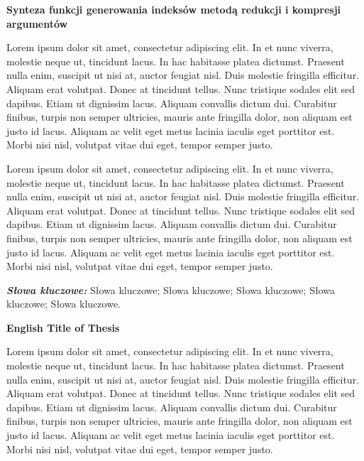 \newpage
\vspace{10cm}

\newpage
\begin{center}
	\textbf{Synteza funkcji generowania indeksów metodą redukcji i kompresji argumentów}
\end{center}

Lorem ipsum dolor sit amet, consectetur adipiscing elit. In et nunc viverra, molestie neque ut, tincidunt lacus. In hac habitasse platea dictumst. Praesent nulla enim, suscipit ut nisi at, auctor feugiat nisl. Duis molestie fringilla efficitur. Aliquam erat volutpat. Donec at tincidunt tellus. Nunc tristique sodales elit sed dapibus. Etiam ut dignissim lacus. Aliquam convallis dictum dui. Curabitur finibus, turpis non semper ultricies, mauris ante fringilla dolor, non aliquam est justo id lacus. Aliquam ac velit eget metus lacinia iaculis eget porttitor est. Morbi nisi nisl, volutpat vitae dui eget, tempor semper justo.

Lorem ipsum dolor sit amet, consectetur adipiscing elit. In et nunc viverra, molestie neque ut, tincidunt lacus. In hac habitasse platea dictumst. Praesent nulla enim, suscipit ut nisi at, auctor feugiat nisl. Duis molestie fringilla efficitur. Aliquam erat volutpat. Donec at tincidunt tellus. Nunc tristique sodales elit sed dapibus. Etiam ut dignissim lacus. Aliquam convallis dictum dui. Curabitur finibus, turpis non semper ultricies, mauris ante fringilla dolor, non aliquam est justo id lacus. Aliquam ac velit eget metus lacinia iaculis eget porttitor est. Morbi nisi nisl, volutpat vitae dui eget, tempor semper justo.

\textit{\textbf{Słowa kluczowe:}} Słowa kluczowe; Słowa kluczowe; Słowa kluczowe; Słowa kluczowe; Słowa kluczowe.

	\vspace{1cm}
\newpage %

\begin{center}
	\textbf{English Title of Thesis}
\end{center}

Lorem ipsum dolor sit amet, consectetur adipiscing elit. In et nunc viverra, molestie neque ut, tincidunt lacus. In hac habitasse platea dictumst. Praesent nulla enim, suscipit ut nisi at, auctor feugiat nisl. Duis molestie fringilla efficitur. Aliquam erat volutpat. Donec at tincidunt tellus. Nunc tristique sodales elit sed dapibus. Etiam ut dignissim lacus. Aliquam convallis dictum dui. Curabitur finibus, turpis non semper ultricies, mauris ante fringilla dolor, non aliquam est justo id lacus. Aliquam ac velit eget metus lacinia iaculis eget porttitor est. Morbi nisi nisl, volutpat vitae dui eget, tempor semper justo.

